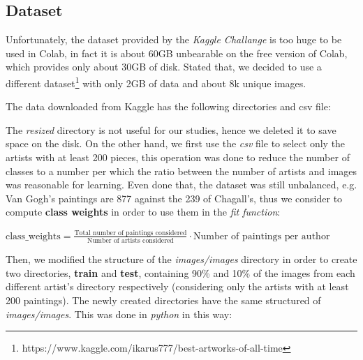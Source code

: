 \subsection{Dataset}
Unfortunately, the dataset provided by the \textit{Kaggle Challange} is too huge to be used in Colab, in fact it is about 60GB unbearable on the free version of Colab, which provides only about 30GB of disk. Stated that, we decided to use a different dataset\footnote{https://www.kaggle.com/ikarus777/best-artworks-of-all-time} with only 2GB of data and about 8k unique images.

\noindent The data downloaded from Kaggle has the following directories and csv file:

\noindent The \textit{resized} directory is not useful for our studies, hence we deleted it to save space on the disk. On the other hand, we first use the \textit{csv} file to select only the artists with at least 200 pieces, this operation was done to reduce the number of classes to a number per which the ratio between the number of artists and images was reasonable for learning. Even done that, the dataset was still unbalanced, e.g. Van Gogh's paintings are 877 against the 239 of Chagall's, thus we consider to compute \textbf{class weights} in order to use them in the \textit{fit function}:

$
	\text{class\_weights} = \frac{\text{Total number of paintings considered}}{\text{Number of artists considered}}\cdot \text{Number of paintings per author}
$

\noindent Then, we modified the structure of the \textit{images/images} directory in order to create two directories, \textbf{train} and \textbf{test}, containing 90\% and 10\% of the images from each different artist's directory respectively (considering only the artists with at least 200 paintings). The newly created directories have the same structured of \textit{images/images}. This was done in \textit{python} in this way:

